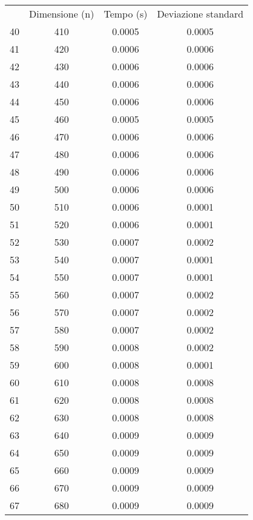 \begin{table}
\centering
\begin{adjustbox}{width=1\textwidth/2}
\begin{tabular}{|c|c|c|c|}
\hline
 & Dimensione (n) & Tempo (s) & Deviazione standard \\
40 & 410 & 0.0005 & 0.0005 \\
\cline{1-4}
41 & 420 & 0.0006 & 0.0006 \\
\cline{1-4}
42 & 430 & 0.0006 & 0.0006 \\
\cline{1-4}
43 & 440 & 0.0006 & 0.0006 \\
\cline{1-4}
44 & 450 & 0.0006 & 0.0006 \\
\cline{1-4}
45 & 460 & 0.0005 & 0.0005 \\
\cline{1-4}
46 & 470 & 0.0006 & 0.0006 \\
\cline{1-4}
47 & 480 & 0.0006 & 0.0006 \\
\cline{1-4}
48 & 490 & 0.0006 & 0.0006 \\
\cline{1-4}
49 & 500 & 0.0006 & 0.0006 \\
\cline{1-4}
50 & 510 & 0.0006 & 0.0001 \\
\cline{1-4}
51 & 520 & 0.0006 & 0.0001 \\
\cline{1-4}
52 & 530 & 0.0007 & 0.0002 \\
\cline{1-4}
53 & 540 & 0.0007 & 0.0001 \\
\cline{1-4}
54 & 550 & 0.0007 & 0.0001 \\
\cline{1-4}
55 & 560 & 0.0007 & 0.0002 \\
\cline{1-4}
56 & 570 & 0.0007 & 0.0002 \\
\cline{1-4}
57 & 580 & 0.0007 & 0.0002 \\
\cline{1-4}
58 & 590 & 0.0008 & 0.0002 \\
\cline{1-4}
59 & 600 & 0.0008 & 0.0001 \\
\cline{1-4}
60 & 610 & 0.0008 & 0.0008 \\
\cline{1-4}
61 & 620 & 0.0008 & 0.0008 \\
\cline{1-4}
62 & 630 & 0.0008 & 0.0008 \\
\cline{1-4}
63 & 640 & 0.0009 & 0.0009 \\
\cline{1-4}
64 & 650 & 0.0009 & 0.0009 \\
\cline{1-4}
65 & 660 & 0.0009 & 0.0009 \\
\cline{1-4}
66 & 670 & 0.0009 & 0.0009 \\
\cline{1-4}
67 & 680 & 0.0009 & 0.0009 \\
\cline{1-4}

\end{tabular}
\end{adjustbox}
\end{table}
